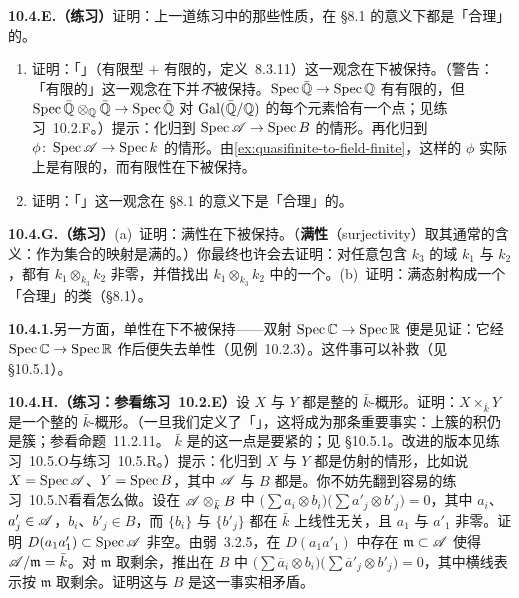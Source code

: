 \textbf{10.4.E.（练习）}\quad 证明：上一道练习中的那些\trMorphism{}性质，在 \S8.1 的意义下都是「合理」的。

\begin{exercise}\label{ex:quasifinite-preserved-base-change}
\begin{enumerate}[label=(\alph*)]
  \item[\hard~(a)] 证明：「\trQuasifinite\trMorphism」（有限型 $+$ 有限的\trFiber，定义~8.3.11）这一观念在\trBaseChange{}下被保持。（警告：「有限的\trFiber」这一观念在\trBaseChange{}下并\emph{不}被保持。$\operatorname{Spec}\bar{\mathbb{Q}}\to\operatorname{Spec}\mathbb{Q}$ 有有限的\trFiber，但 $\operatorname{Spec}\bar{\mathbb{Q}}\otimes_{\mathbb{Q}}\bar{\mathbb{Q}}\to\operatorname{Spec}\bar{\mathbb{Q}}$ 对 $\operatorname{Gal}(\bar{\mathbb{Q}}/\mathbb{Q})$ 的每个元素恰有一个点；见\mbox{练习~10.2.F}。）提示：化归到 $\operatorname{Spec}\mathscr{A}\to\operatorname{Spec} B$ 的情形。再化归到 $\phi\colon\operatorname{Spec}\mathscr{A}\to\operatorname{Spec} k$ 的情形。由\cref{ex:quasifinite-to-field-finite}，这样的 $\phi$ 实际上是有限的，而有限性在\trBaseChange{}下被保持。
  \item 证明：「\trQuasifinite\trMorphism」这一观念在 \S8.1 的意义下是「合理」的。
\end{enumerate}
\end{exercise}

\textbf{10.4.G.（练习）}\quad (a)~证明：满性在\trBaseChange{}下被保持。（\textbf{满性}（surjectivity）取其通常的含义：作为集合的映射是满的。）你最终也许会去证明：对任意包含 $k_3$ 的域 $k_1$ 与 $k_2$，都有 $k_1\otimes_{k_3}k_2$ 非零，并借\trZornsLemma{}找出 $k_1\otimes_{k_3}k_2$ 中的一个\trMaximalIdeal。(b)~证明：满态射构成一个「合理」的类（\S8.1）。

\textbf{10.4.1.}\quad 另一方面，单性在\trBaseChange{}下不被保持——双射 $\operatorname{Spec}\mathbb{C}\to\operatorname{Spec}\mathbb{R}$ 便是见证：它经 $\operatorname{Spec}\mathbb{C}\to\operatorname{Spec}\mathbb{R}$ 作\trBaseChange{}后便失去单性（见例~10.2.3）。这件事可以补救（见 \S10.5.1）。

\textbf{10.4.H.（练习：参看\mbox{练习~10.2.E}）}\quad 设 $X$ 与 $Y$ 都是整的\trFiniteType{} $\bar{k}$-概形。证明：$X\times_{\bar{k}}Y$ 是一个整的\trFiniteType{} $\bar{k}$-概形。（一旦我们定义了「\trVariety」，这将成为那条重要事实：\trAlgClosedField{}上\trIrreducible{}簇的积仍是\trIrreducible{}簇；参看命题~11.2.11。\trBaseField{} $\bar{k}$ 是\trAlgClosed{}的这一点是要紧的；见 \S10.5.1。改进的版本见\mbox{练习~10.5.O}与\mbox{练习~10.5.R}。）提示：化归到 $X$ 与 $Y$ 都是仿射的情形，比如说 $X=\operatorname{Spec}\mathscr{A}$、$Y=\operatorname{Spec} B$，其中 $\mathscr{A}$ 与 $B$ 都是\trIntegralDomain。你不妨先翻到\mbox{容易的练习~10.5.N}看看怎么做。设在 $\mathscr{A}\otimes_{\bar{k}}B$ 中 $\bigl(\sum a_i\otimes b_i\bigr)\bigl(\sum a'_j\otimes b'_j\bigr)=0$，其中 $a_i$、$a'_j\in\mathscr{A}$，$b_i$、$b'_j\in B$，而 $\{b_i\}$ 与 $\{b'_j\}$ 都在 $\bar{k}$ 上线性无关，且 $a_1$ 与 $a'_1$ 非零。证明 $D(a_1a'_1)\subset\operatorname{Spec}\mathscr{A}$ 非空。由弱\trNullstellensatz~3.2.5，在 $D(a_1a'_1)$ 中存在\trMaximalIdeal{} $\mathfrak{m}\subset\mathscr{A}$ 使得 $\mathscr{A}/\mathfrak{m}=\bar{k}$。对 $\mathfrak{m}$ 取剩余，推出在 $B$ 中 $\bigl(\sum\overline{a}_i\otimes b_i\bigr)\bigl(\sum\overline{a}'_j\otimes b'_j\bigr)=0$，其中横线表示按 $\mathfrak{m}$ 取剩余。证明这与 $B$ 是\trIntegralDomain{}这一事实相矛盾。
